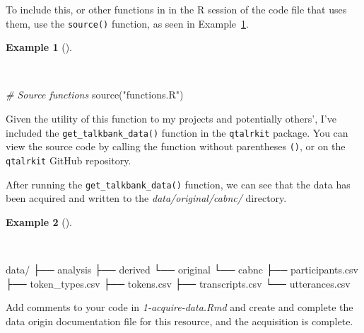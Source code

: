 \documentclass[
  letterpaper,
  DIV=11,
  numbers=noendperiod]{scrreport}
\newenvironment{Shaded}{\begin{snugshade}}{\end{snugshade}}
\newcommand{\CommentTok}[1]{\textcolor[rgb]{0.00,0.00,0.00}{\textit{#1}}}
\newcommand{\ExtensionTok}[1]{\textcolor[rgb]{0.00,0.00,0.00}{#1}}
\newcommand{\FunctionTok}[1]{\textcolor[rgb]{0.00,0.00,0.00}{#1}}
\newcommand{\NormalTok}[1]{\textcolor[rgb]{0.00,0.00,0.00}{#1}}
\newcommand{\StringTok}[1]{\textcolor[rgb]{0.00,0.00,0.00}{#1}}
\theoremstyle{definition}
\newtheorem{example}{Example}[chapter]
\theoremstyle{remark}
\begin{document}
To include this, or other functions in in the R session of the code file
that uses them, use the \texttt{source()} function, as seen in
Example~\ref{exm-ad-source-functions}.

\begin{example}[]\protect\hypertarget{exm-ad-source-functions}{}\label{exm-ad-source-functions}

~

\begin{Shaded}
\begin{Highlighting}[]
\CommentTok{\# Source functions}
\FunctionTok{source}\NormalTok{(}\StringTok{"functions.R"}\NormalTok{)}
\end{Highlighting}
\end{Shaded}

\end{example}

Given the utility of this function to my projects and potentially
others', I've included the \texttt{get\_talkbank\_data()} function in
the \texttt{qtalrkit} package. You can view the source code by calling
the function without parentheses \texttt{()}, or on the
\texttt{qtalrkit} GitHub repository.

After running the \texttt{get\_talkbank\_data()} function, we can see
that the data has been acquired and written to the
\emph{data/original/cabnc/} directory.

\begin{example}[]\protect\hypertarget{exm-ad-functions-r}{}\label{exm-ad-functions-r}

~

\begin{Shaded}
\begin{Highlighting}[]
\ExtensionTok{data/}
\ExtensionTok{├──}\NormalTok{ analysis}
\ExtensionTok{├──}\NormalTok{ derived}
\ExtensionTok{└──}\NormalTok{ original}
    \ExtensionTok{└──}\NormalTok{ cabnc}
        \ExtensionTok{├──}\NormalTok{ participants.csv}
        \ExtensionTok{├──}\NormalTok{ token\_types.csv}
        \ExtensionTok{├──}\NormalTok{ tokens.csv}
        \ExtensionTok{├──}\NormalTok{ transcripts.csv}
        \ExtensionTok{└──}\NormalTok{ utterances.csv}
\end{Highlighting}
\end{Shaded}

\end{example}

Add comments to your code in \emph{1-acquire-data.Rmd} and create and
complete the data origin documentation file for this resource, and the
acquisition is complete.
\end{document}
